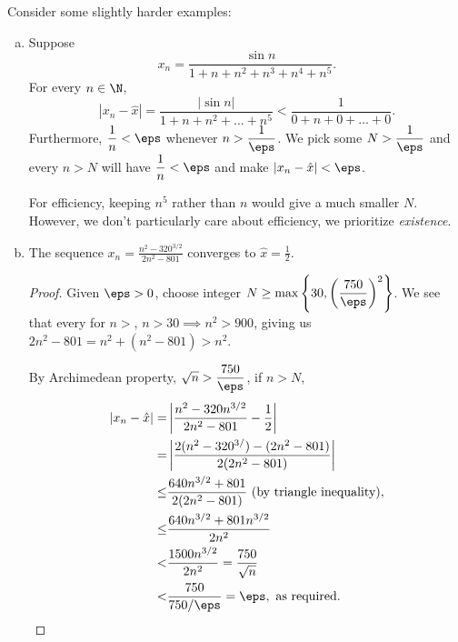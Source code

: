 \begin{example}
	Consider some slightly harder examples:
	\begin{enumerate}[(a)]
		\item Suppose
		\begin{equation*}
			x_n=\frac{\sin{n}}{1+n+n^2+n^3+n^4+n^5}.
		\end{equation*}
		For every \(n\in\N\), 
		\begin{equation*}
			|x_n-\hat{x}|=\frac{|\sin{n}|}{1+n+n^2+\dots+n^5}<\frac{1}{0+n+0+\dots+0}.
		\end{equation*}
		Furthermore, \(\displaystyle\frac{1}{n}<\eps\) whenever \(n>\displaystyle\frac{1}{\eps}\). We pick some \(N>\displaystyle\frac{1}{\eps}\) and every \(n>N\) will have \(\displaystyle\frac{1}{n}<\eps\) and make \(|x_n-\hat{x}|<\eps\).
		\begin{note}
			For efficiency, keeping \(n^5\) rather than \(n\) would give a much smaller \(N\). However, we don't particularly care about efficiency, we prioritize \emph{existence}. 
		\end{note}
		
		\item The sequence \(x_n=\displaystyle\frac{n^2-320^{3/2}}{2n^2-801}\) converges to \(\hat{x}=\displaystyle\frac{1}{2}\).
		
		\begin{proof}
			Given \(\eps>0\), choose integer \(N\geq\operatorname{max}\left\{30,\displaystyle\left(\frac{750}{\eps}\right)^2\right\}\). We see that every for \(n>\), \(n>30\implies n^2>900\), giving us \(2n^2-801=n^2+(n^2-801)>n^2\).
			
			\medskip
			
			By Archimedean property, \(\sqrt{n}>\displaystyle\frac{750}{\eps}\), if \(n>N\),
			\begin{align*}
				|x_n-\hat{x}|=&\left|\frac{n^2-320n^{3/2}}{2n^2-801}-\frac{1}{2}\right|\\
							 =&\left|\frac{2(n^2-320^{3/})-(2n^2-801)}{2(2n^2-801)}\right|\\
							 \leq&\frac{640n^{3/2}+801}{2(2n^2-801)}~(\text{by triangle inequality}),\\
							 \leq&\frac{640n^{3/2}+801n^{3/2}}{2n^2}\\
							 <&\frac{1500n^{3/2}}{2n^2}=\frac{750}{\sqrt{n}}\\
							 <&\frac{750}{750/\eps}=\eps,~\text{as required}.
			\end{align*} 
		\end{proof}
		

\end{enumerate}
\end{example}
